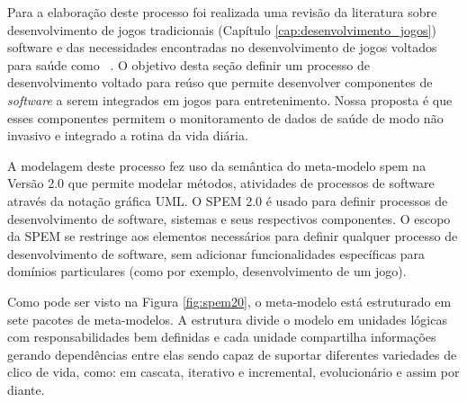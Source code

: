 Para a elaboração deste processo foi realizada uma revisão da literatura sobre desenvolvimento de jogos tradicionais (Capítulo \ref{cap:desenvolvimento_jogos}) ~\cite{keith2010agile,moore2011basics,rucker2003,kanode2009} software e das necessidades encontradas no desenvolvimento de jogos voltados para saúde como ~\cite{Suhonen_2010,herber2011,bartolome11,sinclair07,Hardy2011,kato12}. O objetivo desta seção definir um processo de desenvolvimento voltado para reúso que permite desenvolver componentes de \textit{software} a serem integrados em  jogos para entretenimento. Nossa proposta é que esses componentes permitem o monitoramento de dados de saúde de modo não invasivo e integrado a rotina da vida diária.


A modelagem deste processo fez uso da semântica do meta-modelo \ac{spem} na Versão 2.0 \cite{spem08} que permite modelar métodos, atividades de processos de software através da notação gráfica UML. O SPEM 2.0 é usado para definir processos de desenvolvimento de software, sistemas e seus respectivos componentes. O escopo da SPEM se restringe aos elementos necessários para definir qualquer processo de desenvolvimento de software, sem adicionar funcionalidades específicas para domínios particulares (como por exemplo, desenvolvimento de um jogo).

Como pode ser visto na Figura \ref{fig:spem20}, o meta-modelo está estruturado em sete pacotes de meta-modelos. A estrutura divide o modelo em unidades lógicas com responsabilidades bem definidas e cada unidade compartilha informações gerando dependências entre elas sendo capaz de suportar diferentes variedades de clico de vida, como: em cascata, iterativo e incremental, evolucionário e assim por diante.


